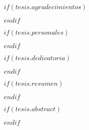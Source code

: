 \newpage
\begin{center}
\end{center}

\newpage
$if(tesis.agradecimientos)$

$endif$

\newpage
\begin{center}
\end{center}

\newpage
$if(tesis.personales)$

$endif$

\newpage
\begin{center}
\end{center}

\newpage
$if(tesis.dedicatoria)$

$endif$

\newpage
\begin{center}
\end{center}


\renewcommand*\contentsname{Tabla de contenidos}
\newpage
\tableofcontents

\newpage


\renewcommand{\listfigurename}{Lista de figuras}
\renewcommand{\listtablename}{Lista de tablas}
\listoffigures
\listoftables

\newpage
\printacronyms[name=Abreviaturas]    

\newpage
$if(tesis.resumen)$

$endif$

\newpage
$if(tesis.abstract)$

$endif$


\newpage
{}